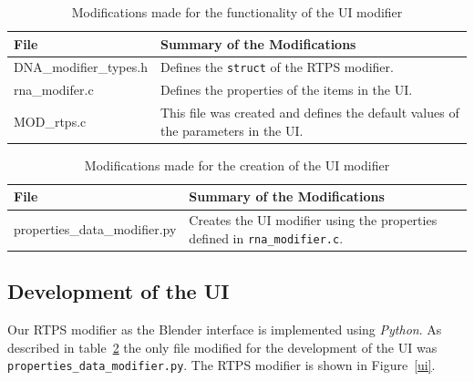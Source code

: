 \begin{table}[htdp]
\caption{Modifications made for the functionality of the UI modifier}
\begin{center}
\begin{tabular}{|p{6cm}|p{6cm}|}
\hline 
\textbf{File} & \textbf{Summary of the Modifications} \\\hline 
DNA\_modifier\_types.h & Defines the \texttt{struct} of the RTPS modifier. \\\hline 
rna\_modifer.c & Defines the properties of the items in the UI. \\\hline 
MOD\_rtps.c & This file was created and defines the default values of the parameters in the UI. \\
\hline 
\end{tabular}
\end{center}
\label{funcTable}
\end{table}

\begin{table}[htdp]
\caption{Modifications made for the creation of the UI modifier}
\begin{center}
\begin{tabular}{|p{6cm}|p{6cm}|}
\hline 
\textbf{File} & \textbf{Summary of the Modifications} \\\hline 
properties\_data\_modifier.py & Creates the UI modifier using the properties defined in \texttt{rna\_modifier.c}. \\
\hline 
\end{tabular}
\end{center}
\label{uiTable}
\end{table}

\subsection{Development of the UI}
Our RTPS modifier as the Blender interface is implemented using \textit{Python}. As described in table~\ref{uiTable} the only file modified for the development of the UI was \texttt{properties\_data\_modifier.py}. The RTPS modifier is shown in Figure~\ref{ui}.

